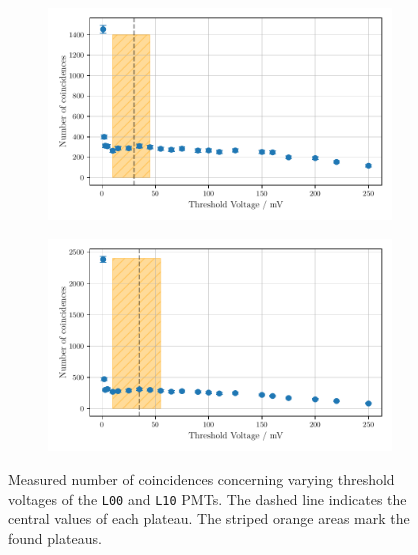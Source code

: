 \begin{figure}
    \centering
    \begin{subfigure}[b]{0.48\textwidth}
        \includegraphics[width=\textwidth]{plots/threshL00.pdf}
    \end{subfigure}\hfill
    \begin{subfigure}[b]{0.48\textwidth}
        \includegraphics[width=\textwidth]{plots/threshL10.pdf}
    \end{subfigure}
    \caption{Measured number of coincidences concerning varying threshold voltages
    of the \texttt{L00} and \texttt{L10} PMTs.
    The dashed line indicates the central values of each plateau. The striped orange areas mark the found plateaus.}
    \label{fig:appthresh3}
\end{figure}
